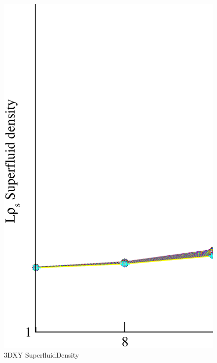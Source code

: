 \begin{figure}[!htpb]
  \centering
  \includegraphics[width=\textwidth]{./plots/3DXY/vsL/SuperfluidDensity.eps}
  \caption{3DXY SuperfluidDensity}
\end{figure}


